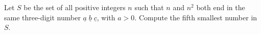 Let $S$ be the set of all positive integers $n$ such that $n$ and $n^2$ both end in the same three-digit number $\underline{a}\;\underline{b}\;\underline{c}$, with $a>0$. Compute the fifth smallest number in $S$.
